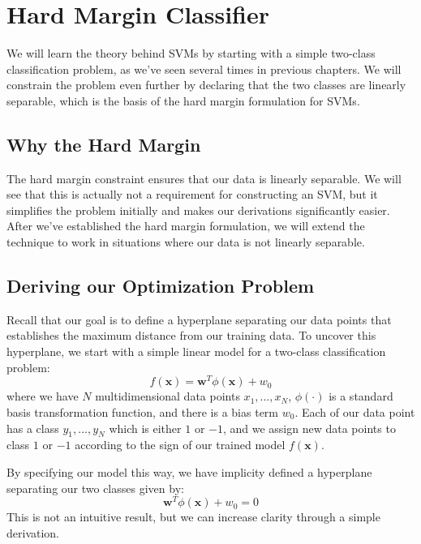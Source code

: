 \section{Hard Margin Classifier}
We will learn the theory behind SVMs by starting with a simple two-class classification problem, as we've seen several times in previous chapters. We will constrain the problem even further by declaring that the two classes are linearly separable, which is the basis of the hard margin formulation for SVMs.

\subsection{Why the Hard Margin}
The hard margin constraint ensures that our data is linearly separable. We will see that this is actually not a requirement for constructing an SVM, but it simplifies the problem initially and makes our derivations significantly easier. After we've established the hard margin formulation, we will extend the technique to work in situations where our data is not linearly separable.

\subsection{Deriving our Optimization Problem}
Recall that our goal is to define a hyperplane separating our data points that establishes the maximum distance from our training data. To uncover this hyperplane, we start with a simple linear model for a two-class classification problem:
\begin{equation} \label{classification-fn}
f(\textbf{x}) = \textbf{w}^{T}\phi(\textbf{x}) + w_{0}
\end{equation}
where we have $N$ multidimensional data points $x_{1}, ..., x_{N}$, $\phi(\cdot)$ is a standard basis transformation function, and there is a bias term $w_{0}$. Each of our data point has a class $y_{1}, ..., y_{N}$ which is either $1$ or $-1$, and we assign new data points to class $1$ or $-1$ according to the sign of our trained model $f(\textbf{x})$.

By specifying our model this way, we have implicity defined a hyperplane separating our two classes given by:
\begin{equation} \label{implicit-hyperplane}
	\textbf{w}^{T}\phi(\textbf{x}) + w_{0} = 0
\end{equation}
This is not an intuitive result, but we can increase clarity through a simple derivation.

